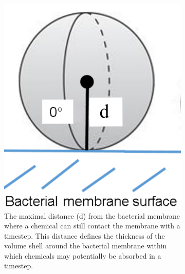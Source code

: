 \begin{supplementary}
\begin{figure}
    \centering
    \begin{subfigure}[b]{0.46\textwidth}
        \centering
        \includegraphics[width = \textwidth]{images/WCMpy/maximal_far.png}
        \caption{
            The maximal distance (d) from the bacterial membrane where a chemical can still contact the membrane with a timestep. This distance defines the thickness of the volume shell around the bacterial membrane within which chemicals may potentially be absorbed in a timestep.   
        }
    \end{subfigure}
    \hfill
    \begin{subfigure}[b]{0.47\textwidth}
        \centering

\end{subfigure}
\end{figure}
\end{supplementary}
